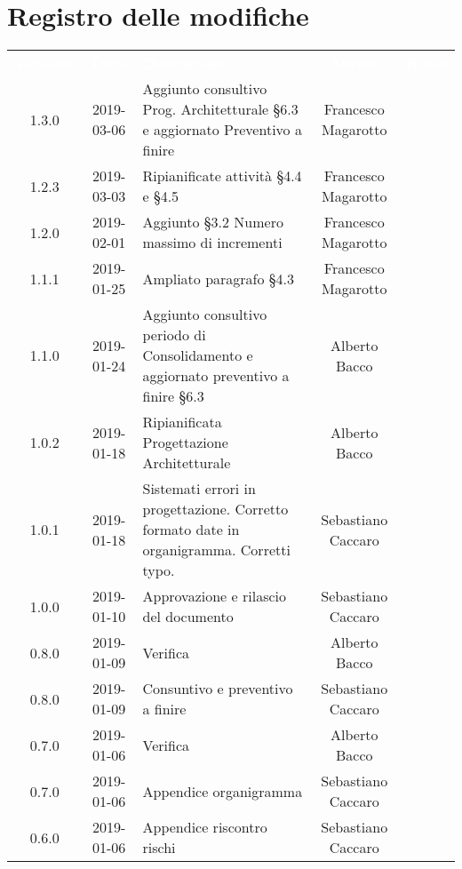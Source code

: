 \section*{Registro delle modifiche}
{
	\renewcommand{\arraystretch}{1.5}
	\centering
	\begin{longtable}{ c c  C{4cm}  c  c }
		
		\textcolor{white}{\textbf{Versione}} & \textcolor{white}{\textbf{Data}} & \textcolor{white}{\textbf{Descrizione}} & \textcolor{white}{\textbf{Autore}} & \textcolor{white}{\textbf{Ruolo}}\\
		1.3.0 & 2019-03-06 & Aggiunto consultivo Prog. Architetturale §6.3 e aggiornato Preventivo a finire & Francesco Magarotto & \reda{}\\
		1.2.3 & 2019-03-03 & Ripianificate attività §4.4 e §4.5 & Francesco Magarotto & \reda{}\\
		1.2.0 & 2019-02-01 & Aggiunto §3.2 Numero massimo di incrementi & Francesco Magarotto & \reda{}\\
		1.1.1 & 2019-01-25 & Ampliato paragrafo §4.3 & Francesco Magarotto & \reda{}\\
		1.1.0 & 2019-01-24 & Aggiunto consultivo periodo di Consolidamento  e aggiornato preventivo a finire §6.3 & Alberto Bacco & \reda{}\\
		1.0.2 & 2019-01-18 & Ripianificata Progettazione Architetturale & Alberto Bacco & \Res{} \\
				1.0.1 & 2019-01-18 & Sistemati errori in progettazione. Corretto formato date in organigramma. Corretti typo. & Sebastiano Caccaro & \reda{}\\	
		1.0.0 & 2019-01-10 & Approvazione e rilascio del documento & Sebastiano Caccaro & \Res{}\\		
		0.8.0 & 2019-01-09 & Verifica & Alberto Bacco & \ver{}\\		
		
		0.8.0 & 2019-01-09 & Consuntivo e preventivo a finire & Sebastiano Caccaro & \reda{}\\			
		
		0.7.0 & 2019-01-06 & Verifica & Alberto Bacco & \ver{}\\		
		
		0.7.0 & 2019-01-06 & Appendice organigramma & Sebastiano Caccaro & \reda{}\\		
		
		0.6.0 & 2019-01-06 & Appendice riscontro rischi & Sebastiano Caccaro & \reda{}\\
					

\end{longtable}}
